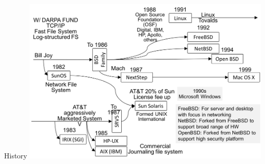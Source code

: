 \documentclass[newPxFont,sthlmFooter,nooffset]{beamer}
\begin{document}
\begin{frame}[c]{History}
\centering
\includegraphics[width=0.9\textwidth]{./figure/history_2.png}
\end{frame}
\end{document}
